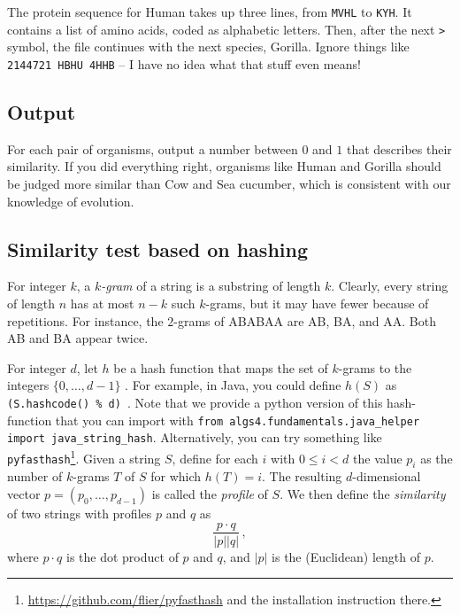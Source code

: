 \documentclass{tufte-handout}
\begin{document}
The protein sequence for Human takes up three lines, from {\tt MVHL} to {\tt KYH}.
It contains a list of amino acids, coded as alphabetic letters.
Then, after the next {\tt >} symbol, the file continues with the next species, Gorilla.
Ignore things like {\tt 2144721 HBHU 4HHB} -- I have no idea what that stuff even means!

\subsection{Output}

For each pair of organisms, output a number between $0$ and $1$ that describes their similarity.
If you did everything right, organisms like Human and Gorilla should be judged more similar than Cow and Sea cucumber, which is consistent with our knowledge of evolution.


\subsection{Similarity test based on hashing}

For integer $k$, a \emph{$k$-gram} of a string is a substring of length $k$.
Clearly, every string of length $n$ has at most $n-k$ such $k$-grams, but it may have fewer because of repetitions.
For instance, the $2$-grams of ABABAA are AB, BA, and AA.
Both AB and BA appear twice.

For integer $d$, let $h$ be a hash function that maps the set of $k$-grams to the integers $\{0,\ldots,d-1\}$ .
For example, in Java, you could define $h(S)$ as
{\tt (S.hashcode() \% d) }.
Note that we provide a python version of this hash-function that you can import with \texttt{from algs4.fundamentals.java\_helper import java\_string\_hash}.
Alternatively, you can try something like \texttt{pyfasthash}\footnote{\url{https://github.com/flier/pyfasthash} and the installation instruction there.}.
Given a string $S$, define for each $i$ with $0\leq i< d$ the value $p_i$ as the number of $k$-grams $T$ of $S$ for which $h(T) = i$.
The resulting $d$-dimensional vector $p=(p_0,\ldots,p_{d-1})$ is called the \emph{profile} of $S$.
We then define the \emph{similarity} of two strings with profiles $p$ and $q$ as
\[
    \frac{p\cdot q}{\left|p\right| \left|q\right|}\,,
\]
where $p\cdot q$ is the dot product
of $p$ and $q$, and $|p|$ is the (Euclidean) length of $p$.
\end{document}
